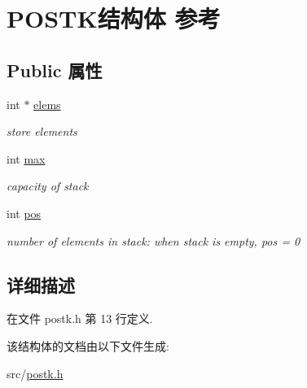 \hypertarget{structPOSTK}{}\section{P\+O\+S\+T\+K结构体 参考}
\label{structPOSTK}
\subsection*{Public 属性}
\begin{DoxyCompactItemize}
\item 
int $\ast$ \hyperlink{structPOSTK_a03fa273646d4ea4e3961694a5820e96d}{elems}\hypertarget{structPOSTK_a03fa273646d4ea4e3961694a5820e96d}{}\label{structPOSTK_a03fa273646d4ea4e3961694a5820e96d}

\begin{DoxyCompactList}\small\item\em store elements \end{DoxyCompactList}\item 
int \hyperlink{structPOSTK_a6ab28fe045a6fa3ad9686440ae25770f}{max}\hypertarget{structPOSTK_a6ab28fe045a6fa3ad9686440ae25770f}{}\label{structPOSTK_a6ab28fe045a6fa3ad9686440ae25770f}

\begin{DoxyCompactList}\small\item\em capacity of stack \end{DoxyCompactList}\item 
int \hyperlink{structPOSTK_abdfaae2468a5aabeb5438b67cfe2bbc4}{pos}\hypertarget{structPOSTK_abdfaae2468a5aabeb5438b67cfe2bbc4}{}\label{structPOSTK_abdfaae2468a5aabeb5438b67cfe2bbc4}

\begin{DoxyCompactList}\small\item\em number of elements in stack\+: when stack is empty, pos = 0 \end{DoxyCompactList}\end{DoxyCompactItemize}


\subsection{详细描述}


在文件 postk.\+h 第 13 行定义.



该结构体的文档由以下文件生成\+:\begin{DoxyCompactItemize}
\item 
src/\hyperlink{postk_8h}{postk.\+h}\end{DoxyCompactItemize}
